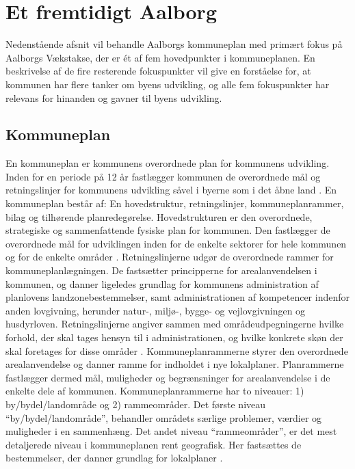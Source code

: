 \chapter{Et fremtidigt Aalborg}
Nedenstående afsnit vil behandle Aalborgs kommuneplan med primært fokus på Aalborgs Vækstakse, der er ét af fem hovedpunkter i kommuneplanen. En beskrivelse af de fire resterende fokuspunkter vil give en forståelse for, at kommunen har flere tanker om byens udvikling, og alle fem fokuspunkter har relevans for hinanden og gavner til byens udvikling.

\section{Kommuneplan}
En kommuneplan er kommunens overordnede plan for kommunens udvikling. Inden for en periode på 12 år fastlægger kommunen de overordnede mål og retningslinjer for kommunens udvikling såvel i byerne som i det åbne land \citep{kommuneplan1}. 
\newline
\newline
En kommuneplan består af: En hovedstruktur, retningslinjer, kommuneplanrammer, bilag og tilhørende planredegørelse. 
\newline \indent{     }  Hovedstrukturen er den overordnede, strategiske og sammenfattende fysiske plan for kommunen. Den fastlægger de overordnede mål for udviklingen inden for de enkelte sektorer for hele kommunen og for de enkelte områder \citep{kommuneplan1}.
\newline \indent{     }  Retningslinjerne udgør de overordnede rammer for kommuneplanlægningen. De fastsætter principperne for arealanvendelsen i kommunen, og danner ligeledes grundlag for kommunens administration af planlovens landzonebestemmelser, samt administrationen af kompetencer indenfor anden lovgivning, herunder natur-, miljø-, bygge- og vejlovgivningen og husdyrloven. Retningslinjerne angiver sammen med områdeudpegningerne hvilke forhold, der skal tages hensyn til i administrationen, og hvilke konkrete skøn der skal foretages for disse områder \citep{retningslinjer}. 
\newline \indent{     }  Kommuneplanrammerne styrer den overordnede arealanvendelse og danner ramme for indholdet i nye lokalplaner. Planrammerne fastlægger dermed mål, muligheder og begrænsninger for arealanvendelse i de enkelte dele af kommunen. Kommuneplanrammerne har to niveauer: 1) by/bydel/landområde og 2) rammeområder. Det første niveau “by/bydel/landområde”, behandler områdets særlige problemer, værdier og muligheder i en sammenhæng. Det andet niveau “rammeområder”, er det mest detaljerede niveau i kommuneplanen rent geografisk. Her fastsættes de bestemmelser, der danner grundlag for lokalplaner \citep{rammer}. 
